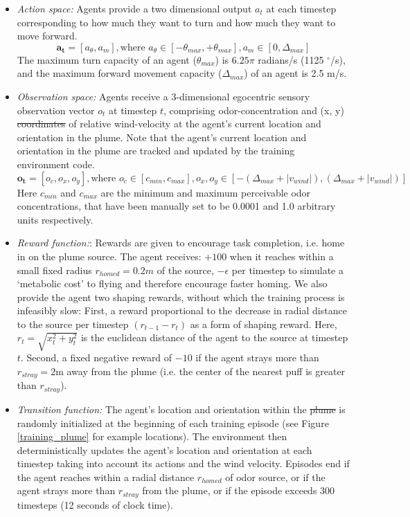 \documentclass[5p,twocolumn,authoryear]{elsarticle}
\providecommand{\DIFaddtex}[1]{{\protect\color{blue}\uwave{#1}}} %
\providecommand{\DIFdeltex}[1]{{\protect\color{red}\sout{#1}}}                      %
\providecommand{\DIFaddbegin}{} %
\providecommand{\DIFaddend}{} %
\providecommand{\DIFdelbegin}{} %
\providecommand{\DIFdelend}{} %
\providecommand{\DIFadd}[1]{\texorpdfstring{\DIFaddtex{#1}}{#1}} %
\providecommand{\DIFdel}[1]{\texorpdfstring{\DIFdeltex{#1}}{}} %
\newcommand{\DIFscaledelfig}{0.5}
\newlength{\DIFdelgraphicswidth} %
\newlength{\DIFdelgraphicsheight} %
\newcommand{\DIFaddincludegraphics}[2][]{{\color{blue}\fbox{\DIFOincludegraphics[#1]{#2}}}} %
\newcommand{\DIFdelincludegraphics}[2][]{%
\sbox{\DIFdelgraphicsbox}{\DIFOincludegraphics[#1]{#2}}%
\settoboxwidth{\DIFdelgraphicswidth}{\DIFdelgraphicsbox} %
\settoboxtotalheight{\DIFdelgraphicsheight}{\DIFdelgraphicsbox} %
\scalebox{\DIFscaledelfig}{%
\parbox[b]{\DIFdelgraphicswidth}{\usebox{\DIFdelgraphicsbox}\\[-\baselineskip] \rule{\DIFdelgraphicswidth}{0em}}\llap{\resizebox{\DIFdelgraphicswidth}{\DIFdelgraphicsheight}{%
\setlength{\unitlength}{\DIFdelgraphicswidth}%
\begin{picture}(1,1)%
\thicklines\linethickness{2pt} %
{\color[rgb]{1,0,0}\put(0,0){\framebox(1,1){}}}%
{\color[rgb]{1,0,0}\put(0,0){\line( 1,1){1}}}%
{\color[rgb]{1,0,0}\put(0,1){\line(1,-1){1}}}%
\end{picture}%
}\hspace*{3pt}}} %
} %
\DeclareRobustCommand{\DIFaddbegin}{\DIFOaddbegin \let\includegraphics\DIFaddincludegraphics} %
\DeclareRobustCommand{\DIFaddend}{\DIFOaddend \let\includegraphics\DIFOincludegraphics} %
\DeclareRobustCommand{\DIFdelbegin}{\DIFOdelbegin \let\includegraphics\DIFdelincludegraphics} %
\DeclareRobustCommand{\DIFdelend}{\DIFOaddend \let\includegraphics\DIFOincludegraphics} %
\begin{document}
\begin{itemize}
    \item 
    \textit{Action space:} Agents provide a two dimensional output $a_t$ at each timestep corresponding to how much they want to turn and how much they want to move forward.
    $$ \mathbf{a_t} = [a_{\theta}, a_m], \text{where } a_{\theta} \in [-\theta_{max}, +\theta_{max}], a_m \in [0, \Delta_{max}]$$ 
    The maximum turn capacity of an agent ($\theta_{max}$) is $6.25\pi$ radians/s (1125 $^\circ$/s), and the maximum forward movement capacity ($\Delta_{max}$) of an agent is 2.5 m/s.

    \item 
    \textit{Observation space:} Agents receive a 3-dimensional egocentric sensory observation vector $o_t$ at timestep $t$, comprising odor-concentration and (x, y) \DIFdelbegin \DIFdel{coordinates }\DIFdelend \DIFaddbegin \DIFadd{components }\DIFaddend of relative wind-velocity at the agent's current location and orientation in the plume.
    Note that the agent's current location and orientation in the plume are tracked and updated by the training environment code. 
    $$ \mathbf{o_t} = [o_c, o_x, o_y], \text{where } o_c \in [c_{min}, c_{max}], o_x,o_y \in [-(\Delta_{max} + |v_{wind}|), (\Delta_{max} + |v_{wind}|)]$$ 
    Here $c_{min}$ and $c_{max}$ are the minimum and maximum perceivable odor concentrations, that have been manually set to be 0.0001 and 1.0 arbitrary units respectively. 

    \item 
    \textit{Reward function:}:
    Rewards are given to encourage task completion, i.e. home in on the plume source.
    The agent receives:
    $+100$ when it reaches within a small fixed radius $r_{homed} = 0.2m$ of the source, 
    $-\epsilon$ per timestep to simulate a `metabolic cost' to flying and therefore encourage faster homing.
    We also provide the agent two shaping rewards, without which the training process is infeasibly slow:
    First, a reward proportional to the decrease in radial distance to the source per timestep $(r_{t-1} - r_{t})$ as a form of shaping reward.
    Here, $r_{t} = \sqrt{x_t^2 + y_t^2}$ is the euclidean distance of the agent to the source at timestep $t$.
    Second, a fixed negative reward of $-10$ if the agent strays more than $r_{stray} = 2$m away from the plume (i.e. the center of the nearest puff is greater than $r_{stray}$). 

    \item 
    \textit{Transition function:} 
    The agent's location and orientation within the \DIFdelbegin \DIFdel{plume }\DIFdelend \DIFaddbegin \DIFadd{arena }\DIFaddend is randomly initialized at the beginning of each training episode (see Figure \ref{training_plume} for example locations).
    The environment then deterministically updates the agent's location and orientation at each timestep taking into account its actions and the wind velocity. 
    Episodes end if the agent reaches within a radial distance $r_{homed}$ of odor source, or if the agent strays more than $r_{stray}$ from the plume, or if the episode exceeds 300 timesteps (12 seconds of clock time).


\end{itemize}
\end{document}

